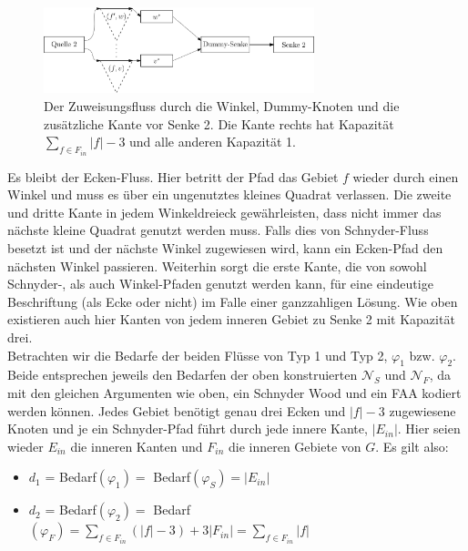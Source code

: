 \begin{figure}[h]
	\centering
  	\includegraphics[width=0.7\textwidth]{dummy_sink.png}
  	\caption{Der Zuweisungsfluss durch die Winkel, Dummy-Knoten und die zusätzliche Kante vor Senke 2. Die Kante rechts hat Kapazität $\sum_{f \in F_{in}} |f|-3$ und alle anderen Kapazität 1.}
	\label{dummy_sink}
\end{figure}

Es bleibt der Ecken-Fluss. Hier betritt der Pfad das Gebiet $f$ wieder durch einen Winkel und muss es über ein ungenutztes kleines Quadrat verlassen. Die zweite und dritte Kante in jedem Winkeldreieck gewährleisten, dass nicht immer das nächste kleine Quadrat genutzt werden muss. Falls dies von Schnyder-Fluss besetzt ist und der nächste Winkel zugewiesen wird, kann ein Ecken-Pfad den nächsten Winkel passieren. Weiterhin sorgt die erste Kante, die von sowohl Schnyder-, als auch Winkel-Pfaden genutzt werden kann, für eine eindeutige Beschriftung (als Ecke oder nicht) im Falle einer ganzzahligen Lösung. Wie oben existieren auch hier Kanten von jedem inneren Gebiet zu Senke 2 mit Kapazität drei.\\

Betrachten wir die Bedarfe der beiden Flüsse von Typ 1 und Typ 2, $\varphi_1$ bzw. $\varphi_2$. Beide entsprechen jeweils den Bedarfen der oben konstruierten $\mathcal{N}_S$ und $\mathcal{N}_F$, da mit den gleichen Argumenten wie oben, ein Schnyder Wood und ein FAA kodiert werden können. Jedes Gebiet benötigt genau drei Ecken und $|f|-3$ zugewiesene Knoten und je ein Schnyder-Pfad führt durch jede innere Kante, $|E_{in}|$. Hier seien wieder $E_{in}$ die inneren Kanten und $F_{in}$ die inneren Gebiete von $G$. Es gilt also:

\begin{itemize}
\item $d_1$ = Bedarf$(\varphi_1) = $ Bedarf$(\varphi_S) = |E_{in}|$
\item $d_2$ = Bedarf$(\varphi_2) = $ Bedarf$(\varphi_F) =  \sum_{f \in F_{in}}(|f|-3) + 3|F_{in}| = \sum_{f \in F_{in}} |f|$
\end{itemize}

